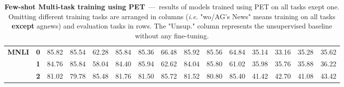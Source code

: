 \begin{sidewaystable*}[h]
\begin{tabular*}{\columnwidth}{l@{\extracolsep{\fill}}lccccccccccccc}
		\hline
		\multirow{3}{*}{\textbf{MNLI}}      & \textbf{0} & 85.82                          & 85.54                          & 62.28                          & 85.84                          & 85.36                          & 66.48                          & 85.92                          & 85.56                          & 64.84                          & 35.14                          & 33.16                          & 35.28                          & 35.62                              \\
		& \textbf{1} & 84.76                          & 85.84                          & 58.04                          & 84.40                          & 85.94                          & 62.62                          & 84.04                          & 85.80                          & 61.02                          & 35.98                          & 35.76                          & 35.88                          & 36.22                              \\
		& \textbf{2} & 81.02                          & 79.78                          & 85.48                          & 81.76                          & 81.50                          & 85.72                          & 81.52                          & 80.80                          & 85.40                          & 41.42                          & 42.70                          & 41.08                          & 43.42                             \\
		\bottomrule
\end{tabular*}
	\caption{\textbf{Few-shot Multi-task training using PET}~---~results of models trained using PET on all tasks exept one. Omitting different training tasks are arranged in columns (\textit{i.e.} "wo/AG's News" means training on all tasks \textbf{except} agnews) and evaluation tasks in rows. The "Unsup." column represents the unsupervised baseline without any fine-tuning.}\label{tab:multi-use-logits-full}
\end{sidewaystable*}
